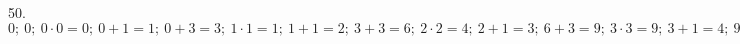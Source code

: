 50. $0;\ 0;\ 0\cdot0=0;\ 0+1=1;\ 0+3=3;\ 1\cdot1=1;\ 1+1=2;\ 3+3=6;\ 2\cdot2=4;\ 2+1=3;\ 6+3=9;\ 3\cdot3=9;\ 3+1=4;\ 9+3=12;\ 4\cdot4=16;\ 4+1=5;\ 12+3=15;\ 5\cdot5=25.$\\
